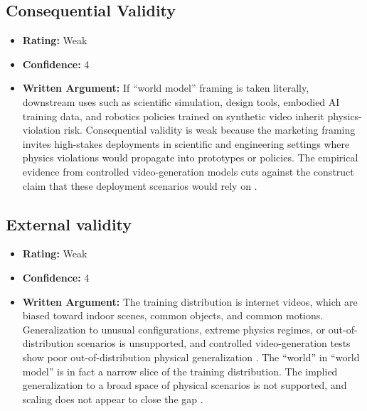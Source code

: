 \subsection{Consequential Validity}
\begin{itemize}
    \item \textbf{Rating:} Weak
    \item \textbf{Confidence:} 4
    \item \textbf{Written Argument:} If ``world model'' framing is taken literally, downstream uses such as scientific simulation, design tools, embodied AI training data, and robotics policies trained on synthetic video inherit physics-violation risk. Consequential validity is weak because the marketing framing invites high-stakes deployments in scientific and engineering settings where physics violations would propagate into prototypes or policies. The empirical evidence from controlled video-generation models \citep{kang2024video} cuts against the construct claim that these deployment scenarios would rely on \citep{salaudeen2025measurement}.
\end{itemize}

\subsection{External validity}
\begin{itemize}
    \item \textbf{Rating:} Weak
    \item \textbf{Confidence:} 4
    \item \textbf{Written Argument:} The training distribution is internet videos, which are biased toward indoor scenes, common objects, and common motions. Generalization to unusual configurations, extreme physics regimes, or out-of-distribution scenarios is unsupported, and controlled video-generation tests show poor out-of-distribution physical generalization \citep{kang2024video}. The ``world'' in ``world model'' is in fact a narrow slice of the training distribution. The implied generalization to a broad space of physical scenarios is not supported, and scaling does not appear to close the gap \citep{salaudeen2025measurement}.
\end{itemize}

